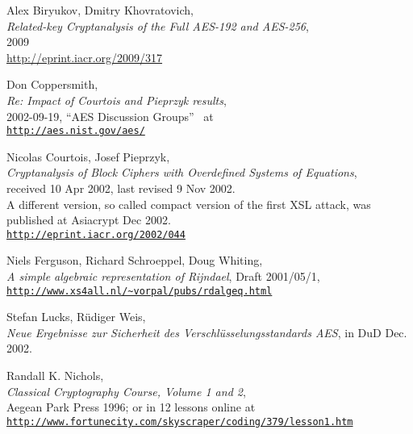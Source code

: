 \newpage
\begin{thebibliography}{99999}

 
	Alex Biryukov, Dmitry Khovratovich, \\
	{\em Related-key Cryptanalysis of the Full AES-192 and AES-256}, \\
	2009 \\
	\url{http://eprint.iacr.org/2009/317}

  
       Don Coppersmith, \\
       {\em Re: Impact of Courtois and Pieprzyk results}, \\
       2002-09-19, ``AES Discussion Groups''~ at \\
       \href{http://aes.nist.gov/aes/}
       {\texttt{http://aes.nist.gov/aes/}}

  
        Nicolas Courtois, Josef Pieprzyk, \\
        {\em Cryptanalysis of Block Ciphers with Overdefined Systems
             of Equations}, \\
        received 10 Apr 2002, last revised 9 Nov 2002.\\
        A different version, so called compact version of the first XSL attack,
       was published at Asiacrypt Dec 2002. \\
       \href{http://eprint.iacr.org/2002/044}
       {\texttt{http://eprint.iacr.org/2002/044}}

  
       Niels Ferguson, Richard Schroeppel, Doug Whiting, \\
       {\em A simple algebraic representation of Rijndael}, 
       Draft 2001/05/1, \\
       \href{http://www.xs4all.nl/~vorpal/pubs/rdalgeq.html}
       {\texttt{http://www.xs4all.nl/\~{}vorpal/pubs/rdalgeq.html}}

  
       Stefan Lucks, R\"udiger Weis, \\
       {\em Neue Ergebnisse zur Sicherheit des Verschl\"usselungsstandards AES}, 
       in DuD Dec. 2002.

  
       Randall K. Nichols, \\
       {\em Classical Cryptography Course, Volume 1 and 2}, \\
       Aegean Park Press 1996;
       or in 12 lessons online at \\
       \href{http://www.fortunecity.com/skyscraper/coding/379/lesson1.htm}
       {\texttt{http://www.fortunecity.com/skyscraper/coding/379/lesson1.htm}}


\end{thebibliography}
